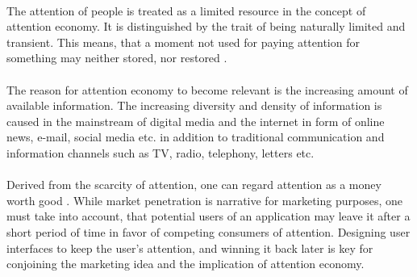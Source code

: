 \paragraph*{} The attention of people is treated as a limited resource in the concept of attention economy. It is distinguished by the trait of being naturally limited and transient. This means, that a moment not used for paying attention for something may neither stored, nor restored \parencite[cf.][]{Davenport.2001}.

\paragraph*{} The reason for attention economy to become relevant is the increasing amount of available information. The increasing diversity and density of information is caused in the mainstream of digital media and the internet in form of online news, e-mail, social media etc. in addition to traditional communication and information channels such as TV, radio, telephony, letters etc.

\paragraph*{} Derived from the scarcity of attention, one can regard attention as a money worth good \parencite[cf.][]{Davenport.2001}. While market penetration is narrative for marketing purposes, one must take into account, that potential users of an application may leave it after a short period of time in favor of competing consumers of attention. Designing user interfaces to keep the user's attention, and winning it back later is key for conjoining the marketing idea and the implication of attention economy.\label{endAtt}